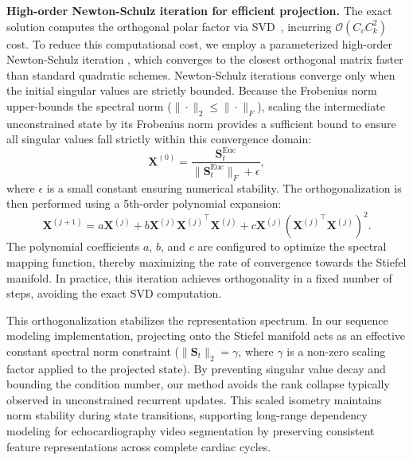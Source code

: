 \noindent
\textbf{High-order Newton-Schulz iteration for efficient projection.}
The exact solution computes the orthogonal polar factor via SVD~\cite{SIAM86_Higham}, incurring $\mathcal{O}(C_v C_k^2)$ cost.
To reduce this computational cost, we employ a parameterized high-order Newton-Schulz iteration \cite{SIAM06_Schur,SIAM06_Newton}, which converges to the closest orthogonal matrix faster than standard quadratic schemes.
Newton-Schulz iterations converge only when the initial singular values are strictly bounded.
Because the Frobenius norm upper-bounds the spectral norm ($\|\cdot\|_2 \le \|\cdot\|_F$), scaling the intermediate unconstrained state by its Frobenius norm provides a sufficient bound to ensure all singular values fall strictly within this convergence domain:
\begin{equation}
  \mathbf{X}^{(0)} = \frac{\mathbf{S}_t^{\text{Euc}}}{\|\mathbf{S}_t^{\text{Euc}}\|_F + \epsilon},
\end{equation}
where $\epsilon$ is a small constant ensuring numerical stability.
The orthogonalization is then performed using a 5th-order polynomial expansion:
\begin{equation}
  \mathbf{X}^{(j+1)} = a\mathbf{X}^{(j)} + b\mathbf{X}^{(j)}{\mathbf{X}^{(j)}}^\top \mathbf{X}^{(j)} + c\mathbf{X}^{(j)}({\mathbf{X}^{(j)}}^\top \mathbf{X}^{(j)})^2.
\end{equation}
The polynomial coefficients $a$, $b$, and $c$ are configured to optimize the spectral mapping function, thereby maximizing the rate of convergence towards the Stiefel manifold.
In practice, this iteration achieves orthogonality in a fixed number of steps, avoiding the exact SVD computation.

This orthogonalization stabilizes the representation spectrum.
In our sequence modeling implementation, projecting onto the Stiefel manifold acts as an effective constant spectral norm constraint ($\|\mathbf{S}_t\|_2 = \gamma$, where $\gamma$ is a non-zero scaling factor applied to the projected state).
By preventing singular value decay and bounding the condition number, our method avoids the rank collapse typically observed in unconstrained recurrent updates.
This scaled isometry maintains norm stability during state transitions, supporting long-range dependency modeling for echocardiography video segmentation by preserving consistent feature representations across complete cardiac cycles.